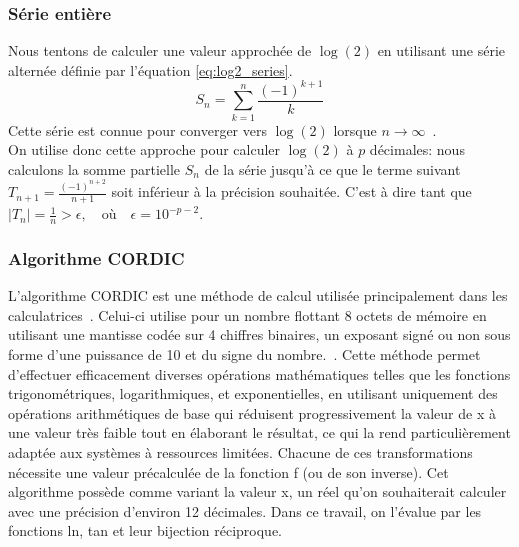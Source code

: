 \documentclass{article}
\begin{document}
\subsubsection{Série entière}
Nous tentons de calculer une valeur approchée de \( \log(2) \) en utilisant une série alternée définie par l'équation \ref{eq:log2_series}.
\begin{equation}
S_n = \sum_{k=1}^{n} \frac{(-1)^{k+1}}{k}
\label{eq:log2_series}
\end{equation}
Cette série est connue pour converger vers \( \log(2) \) lorsque \( n \to \infty \)~\cite{friedli_analyse1}.\\

\noindent On utilise donc cette approche pour calculer \(\log(2)\) à \(p\) décimales: nous calculons la somme partielle \( S_n \) de la série jusqu'à ce que le terme suivant \( T_{n+1}=\frac{(-1)^{n+2}}{n+1} \) soit inférieur à la précision souhaitée. C'est à dire tant que \( |T_n| = \frac{1}{n} > \epsilon, \quad \text{où} \quad \epsilon = 10^{-p-2} \).

\subsubsection{Algorithme CORDIC}
L'algorithme CORDIC est une méthode de calcul utilisée principalement dans les calculatrices~\cite{volder1959cordic}. Celui-ci utilise pour un nombre flottant 8 octets de mémoire en utilisant une mantisse codée sur 4 chiffres binaires, un exposant signé ou non sous forme d'une puissance de 10 et du signe du nombre.~\cite{usenetMathsFAQ}. Cette méthode permet d'effectuer efficacement diverses opérations mathématiques telles que les fonctions trigonométriques, logarithmiques, et exponentielles, en utilisant uniquement des opérations arithmétiques de base qui réduisent progressivement la valeur de x à une valeur très faible tout en élaborant le résultat, ce qui la rend particulièrement adaptée aux systèmes à ressources limitées. Chacune de ces transformations nécessite une valeur précalculée de la fonction f (ou de son inverse). Cet algorithme possède comme variant la valeur x, un réel qu'on souhaiterait calculer avec une précision d'environ 12 décimales. Dans ce travail, on l'évalue par les fonctions ln, tan et leur bijection réciproque. \\ \\
\end{document}

